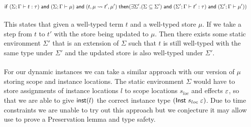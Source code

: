{\begin{lemma}[Preservation]
\[
	\mathsf{if}\;
		(\Sigma;\Gamma \vdash t : \tau)
		\;\mathsf{and}\;
		(\Sigma;\Gamma \vdash \mu)
		\;\mathsf{and}\;
		(t,\mu \underset{}{\rightsquigarrow} t',\mu')
	\;\mathsf{then}\; \\
		(\exists \Sigma'.
			(\Sigma \subseteq \Sigma')
			\;\mathsf{and}\;
			(\Sigma';\Gamma \vdash t' : \tau)
			\;\mathsf{and}\;
			(\Sigma';\Gamma \vdash \mu')
		)
\]
\end{lemma}

This states that given a well-typed term $t$ and a well-typed store $\mu$.
If we take a step from $t$ to $t'$ with the store being updated to $\mu$.
Then there exists some static environment $\Sigma'$ that is an extension of $\Sigma$ such that $t$ is still well-typed with the same type under $\Sigma'$ and the updated store is also well-typed under $\Sigma'$.
\\\\
For our dynamic instances we can take a similar approach with our version of $\mu$ storing scope and instance locations. The static environment $\Sigma$ would have to store assignments of instance locations $l$ to scope locations $s_{loc}$ and effects $\varepsilon$, so that we are able to give $\mathsf{inst}(l)$ the correct instance type $(\mathsf{Inst} \; s_{loc} \; \varepsilon)$.
Due to time constraints we are unable to try out this approach but we conjecture it may allow use to prove a Preservation lemma and type safety.

}
